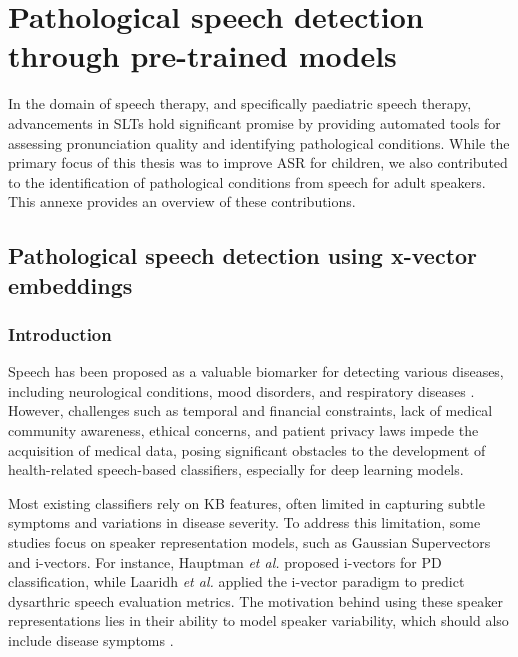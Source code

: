 \chapter{Pathological speech detection through pre-trained models}
\label{chapter:appendixA}

In the domain of speech therapy, and specifically paediatric speech therapy, advancements in \acp{SLT} hold significant promise by providing automated tools for assessing pronunciation quality and identifying pathological conditions. While the primary focus of this thesis was to improve \ac{ASR} for children, we also contributed to the identification of pathological conditions from speech for adult speakers. This annexe provides an overview of these contributions.


\section{Pathological speech detection using x-vector embeddings}
\subsection{Introduction}
Speech has been proposed as a valuable biomarker for detecting various diseases, including neurological conditions, mood disorders, and respiratory diseases \cite{hauptman2019identifying,botelho2019speech}. However, challenges such as temporal and financial constraints, lack of medical community awareness, ethical concerns, and patient privacy laws impede the acquisition of medical data, posing significant obstacles to the development of health-related speech-based classifiers, especially for deep learning models.

Most existing classifiers rely on \ac{KB} features, often limited in capturing subtle symptoms and variations in disease severity. To address this limitation, some studies focus on speaker representation models, such as Gaussian Supervectors and i-vectors. For instance, Hauptman \textit{et al.} \cite{hauptman2019identifying} proposed i-vectors for \ac{PD} classification, while Laaridh \textit{et al.} \cite{laaridh17_interspeech} applied the i-vector paradigm to predict dysarthric speech evaluation metrics. The motivation behind using these speaker representations lies in their ability to model speaker variability, which should also include disease symptoms \cite{hauptman2019identifying}.

